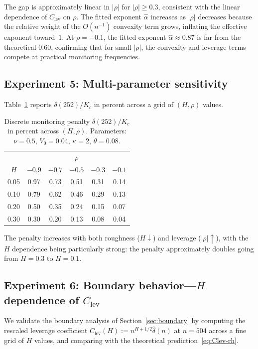 \documentclass[12pt]{article}
\theoremstyle{definition}
\begin{document}
The gap is approximately linear in $|\rho|$ for $|\rho| \ge 0.3$,
consistent with the linear dependence of $C_{\mathrm{lev}}$ on $\rho$.
The fitted exponent $\hat\alpha$ increases as $|\rho|$ decreases
because the relative weight of the $O(n^{-1})$ convexity term grows,
inflating the effective exponent toward~$1$.
At $\rho = -0.1$, the fitted exponent $\hat\alpha \approx 0.87$ is
far from the theoretical $0.60$, confirming that for small $|\rho|$,
the convexity and leverage terms compete at practical monitoring
frequencies.

\subsection{Experiment 5: Multi-parameter sensitivity}
\label{sec:exp5}

Table~\ref{tab:multi-sensitivity} reports $\delta(252)/K_c$ in percent
across a grid of $(H, \rho)$ values.

\begin{table}[htbp]
\centering
\caption{Discrete monitoring penalty $\delta(252)/K_c$ in percent
across $(H,\rho)$.
Parameters: $\nu = 0.5$, $V_0 = 0.04$, $\kappa = 2$, $\theta = 0.08$.}
\label{tab:multi-sensitivity}
\begin{tabular}{c|ccccc}
\toprule
& \multicolumn{5}{c}{$\rho$} \\
$H$ & $-0.9$ & $-0.7$ & $-0.5$ & $-0.3$ & $-0.1$ \\
\midrule
0.05 & 0.97 & 0.73 & 0.51 & 0.31 & 0.14 \\
0.10 & 0.79 & 0.62 & 0.46 & 0.29 & 0.13 \\
0.20 & 0.50 & 0.35 & 0.24 & 0.15 & 0.07 \\
0.30 & 0.30 & 0.20 & 0.13 & 0.08 & 0.04 \\
\bottomrule
\end{tabular}
\end{table}

The penalty increases with both roughness ($H \downarrow$) and
leverage ($|\rho| \uparrow$), with the $H$ dependence being
particularly strong: the penalty approximately doubles going from
$H = 0.3$ to $H = 0.1$.

\subsection{Experiment 6: Boundary behavior---$H$ dependence
of $C_{\mathrm{lev}}$}\label{sec:exp6}

We validate the boundary analysis of Section~\ref{sec:boundary} by
computing the rescaled leverage coefficient
$\hat C_{\mathrm{lev}}(H) := n^{H+1/2}\hat\delta(n)$
at $n = 504$ across a fine grid of $H$ values, and comparing with
the theoretical prediction~\eqref{eq:Clev-rh}.
\end{document}
